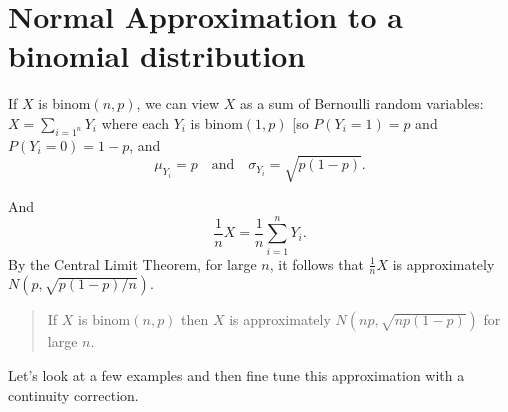 \documentclass[
]{book}
\theoremstyle{definition}
\theoremstyle{definition}
\theoremstyle{definition}
\theoremstyle{definition}
\theoremstyle{remark}
\begin{document}
\section{Normal Approximation to a binomial distribution}\label{normal-approximation-to-a-binomial-distribution}

If \(X\) is binom\((n,p)\), we can view \(X\) as a sum of Bernoulli random variables:
\(X = \sum_{i=1^n}Y_i\) where each \(Y_i\) is binom\((1,p)\) {[}so \(P(Y_i = 1) = p\) and \(P(Y_i = 0) = 1-p\), and \[\mu_{Y_i} = p ~~~\text{ and } ~~~ \sigma_{Y_i} = \sqrt{p(1-p)}.\]

And \[\frac{1}{n}X = \frac{1}{n}\sum_{i=1}^n Y_i.\] By the Central Limit Theorem, for large \(n\), it follows that \(\frac{1}{n}X\) is approximately \(N(p,\sqrt{p(1-p)/n})\).

\begin{quote}
If \(X\) is \(\text{binom}(n,p)\) then \(X\) is approximately \(N(np, \sqrt{np(1-p)})\) for large \(n\).
\end{quote}

Let's look at a few examples and then fine tune this approximation with a continuity correction.
\end{document}
